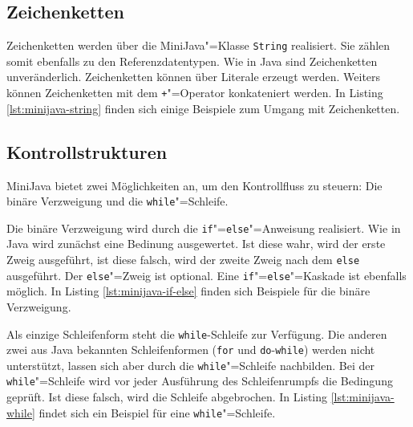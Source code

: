 

\subsection{Zeichenketten}
\label{subsec:MiniJava-Zeichenketten}

Zeichenketten werden über die MiniJava"=Klasse \lstinline{String} realisiert. Sie zählen somit ebenfalls zu den Referenzdatentypen. Wie in Java sind Zeichenketten unveränderlich. Zeichenketten können über Literale erzeugt werden. Weiters können Zeichenketten mit dem \lstinline{+}"=Operator konkateniert werden. In Listing \ref{lst:minijava-string} finden sich einige Beispiele zum Umgang mit Zeichenketten.



\subsection{Kontrollstrukturen}

MiniJava bietet zwei Möglichkeiten an, um den Kontrollfluss zu steuern: Die binäre Verzweigung und die \lstinline{while}"=Schleife.

Die binäre Verzweigung wird durch die \lstinline{if}"=\lstinline{else}"=Anweisung realisiert. Wie in Java wird zunächst eine Bedinung ausgewertet. Ist diese wahr, wird der erste Zweig ausgeführt, ist diese falsch, wird der zweite Zweig nach dem \lstinline{else} ausgeführt. Der \lstinline{else}"=Zweig ist optional. Eine \lstinline{if}"=\lstinline{else}"=Kaskade ist ebenfalls möglich. In Listing \ref{lst:minijava-if-else} finden sich Beispiele für die binäre Verzweigung.



Als einzige Schleifenform steht die \lstinline{while}-Schleife zur Verfügung. Die anderen zwei aus Java bekannten Schleifenformen (\lstinline{for} und \lstinline{do}-\lstinline{while}) werden nicht unterstützt, lassen sich aber durch die \lstinline{while}"=Schleife nachbilden. Bei der \lstinline{while}"=Schleife wird vor jeder Ausführung des Schleifenrumpfs die Bedingung geprüft. Ist diese falsch, wird die Schleife abgebrochen. In Listing \ref{lst:minijava-while} findet sich ein Beispiel für eine \lstinline{while}"=Schleife.

